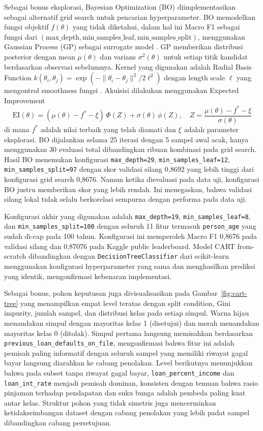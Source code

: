 \documentclass{article}
\begin{document}
Sebagai bonus eksplorasi, Bayesian Optimization (BO) diimplementasikan sebagai alternatif grid search untuk pencarian hyperparameter. BO memodelkan fungsi objektif $f(\theta)$ yang tidak diketahui, dalam hal ini Macro F1 sebagai fungsi dari $(\text{max\_depth}, \text{min\_samples\_leaf}, \text{min\_samples\_split})$, menggunakan Gaussian Process (GP) sebagai surrogate model \cite{snoek2012bo,rasmussen2006gp}. GP memberikan distribusi posterior dengan mean $\mu(\theta)$ dan varians $\sigma^2(\theta)$ untuk setiap titik kandidat berdasarkan observasi sebelumnya. Kernel yang digunakan adalah Radial Basis Function $k(\theta_i, \theta_j) = \exp(-\lVert\theta_i - \theta_j\rVert^2 / 2\ell^2)$ dengan length scale $\ell$ yang mengontrol smoothness fungsi \cite{rasmussen2006gp}. Akuisisi dilakukan menggunakan Expected Improvement \cite{snoek2012bo}
\[
    \text{EI}(\theta) = (\mu(\theta) - f^* - \xi)\,\Phi(Z) + \sigma(\theta)\,\phi(Z),
    \quad Z = \frac{\mu(\theta) - f^* - \xi}{\sigma(\theta)}
\]
di mana $f^*$ adalah nilai terbaik yang telah diamati dan $\xi$ adalah parameter eksplorasi. BO dijalankan selama 25 iterasi dengan 5 sampel awal acak, hanya menggunakan 30 evaluasi total dibandingkan ribuan kombinasi pada grid search. Hasil BO menemukan konfigurasi \texttt{max\_depth=29}, \texttt{min\_samples\_leaf=12}, \texttt{min\_samples\_split=97} dengan skor validasi silang 0,8692 yang lebih tinggi dari konfigurasi grid search 0,8676. Namun ketika dievaluasi pada data uji, konfigurasi BO justru memberikan skor yang lebih rendah. Ini menegaskan, bahwa validasi silang lokal tidak selalu berkorelasi sempurna dengan performa pada data uji.

Konfigurasi akhir yang digunakan adalah \texttt{max\_depth=19}, \texttt{min\_samples\_leaf=8}, dan \texttt{min\_samples\_split=100} dengan seluruh 11 fitur termasuk \texttt{person\_age} yang sudah di-cap pada 100 tahun. Konfigurasi ini memperoleh Macro F1 0,8676 pada validasi silang dan 0,87076 pada Kaggle public leaderboard. Model CART from-scratch dibandingkan dengan \texttt{DecisionTreeClassifier} dari scikit-learn menggunakan konfigurasi hyperparameter yang sama dan menghasilkan prediksi yang identik, mengonfirmasi kebenaran implementasi.

Sebagai bonus, pohon keputusan juga divisualisasikan pada Gambar~\ref{fig:cart-tree} yang menampilkan empat level teratas dengan split condition, Gini impurity, jumlah sampel, dan distribusi kelas pada setiap simpul. Warna hijau menandakan simpul dengan mayoritas kelas 1 (disetujui) dan merah menandakan mayoritas kelas 0 (ditolak). Simpul pertama langsung memisahkan berdasarkan \texttt{previous\_loan\_defaults\_on\_file}, mengonfirmasi bahwa fitur ini adalah pemisah paling informatif dengan seluruh sampel yang memiliki riwayat gagal bayar langsung diarahkan ke cabang penolakan. Level berikutnya menunjukkan bahwa pada subset tanpa riwayat gagal bayar, \texttt{loan\_percent\_income} dan \texttt{loan\_int\_rate} menjadi pemisah dominan, konsisten dengan temuan bahwa rasio pinjaman terhadap pendapatan dan suku bunga adalah pembeda paling kuat antar kelas. Struktur pohon yang tidak simetris juga mencerminkan ketidakseimbangan dataset dengan cabang penolakan yang lebih padat sampel dibandingkan cabang persetujuan.
\end{document}
